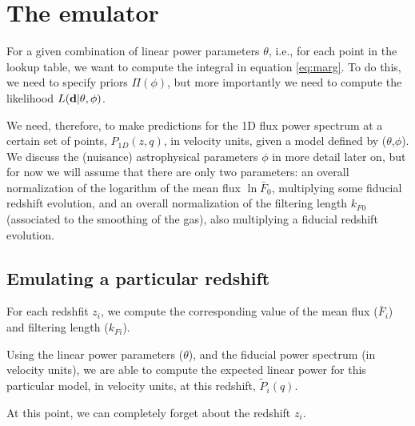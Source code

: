 \section{The emulator} \label{sec:emulator}

For a given combination of linear power parameters $\theta$, i.e., for
each point in the lookup table, we want to compute the integral in
equation \ref{eq:marg}.
To do this, we need to specify priors $\Pi(\phi)$, but more importantly
we need to compute the likelihood $L(\mathbf{d} | \theta, \phi)$.

We need, therefore, to make predictions for the 1D flux power spectrum
at a certain set of points, $P_{1D}(z,q)$, in velocity units, given a model
defined by ($\theta$,$\phi$).
We discuss the (nuisance) astrophysical parameters $\phi$ in more detail
later on, but for now we will assume that there are only two parameters:
an overall normalization of the logarithm of the mean flux $\ln{\bar F_0}$,
multiplying some fiducial redshift evolution, and an overall normalization
of the filtering length $k_{F 0}$ (associated to the smoothing of the gas),
also multiplying a fiducial redshift evolution. 


\subsection{Emulating a particular redshift}

For each redshfit $z_i$, we compute the corresponding value of the mean flux
($\bar F_i$) and filtering length ($k_{Fi}$).

Using the linear power parameters ($\theta$), and the fiducial
power spectrum (in velocity units), we are able to compute the expected
linear power for this particular model, in velocity units, at this redshift,
$\tilde P_i(q)$.


At this point, we can completely forget about the redshift $z_i$.

